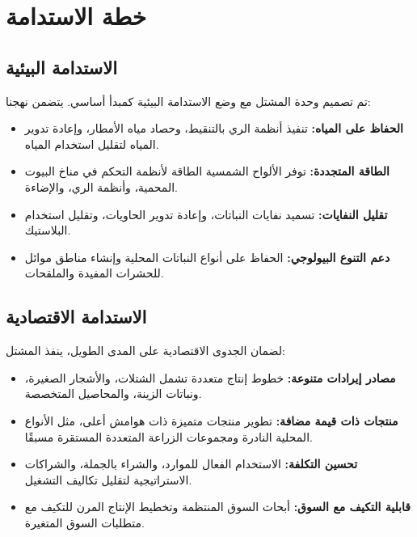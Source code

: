 \section{خطة الاستدامة}

\subsection{الاستدامة البيئية}

تم تصميم وحدة المشتل مع وضع الاستدامة البيئية كمبدأ أساسي. يتضمن نهجنا:

\begin{itemize}
    \item \textbf{الحفاظ على المياه:} تنفيذ أنظمة الري بالتنقيط، وحصاد مياه الأمطار، وإعادة تدوير المياه لتقليل استخدام المياه.
    
    \item \textbf{الطاقة المتجددة:} توفر الألواح الشمسية الطاقة لأنظمة التحكم في مناخ البيوت المحمية، وأنظمة الري، والإضاءة.
    
    \item \textbf{تقليل النفايات:} تسميد نفايات النباتات، وإعادة تدوير الحاويات، وتقليل استخدام البلاستيك.
    
    \item \textbf{دعم التنوع البيولوجي:} الحفاظ على أنواع النباتات المحلية وإنشاء مناطق موائل للحشرات المفيدة والملقحات.
\end{itemize}

\subsection{الاستدامة الاقتصادية}

لضمان الجدوى الاقتصادية على المدى الطويل، ينفذ المشتل:

\begin{itemize}
    \item \textbf{مصادر إيرادات متنوعة:} خطوط إنتاج متعددة تشمل الشتلات، والأشجار الصغيرة، ونباتات الزينة، والمحاصيل المتخصصة.
    
    \item \textbf{منتجات ذات قيمة مضافة:} تطوير منتجات متميزة ذات هوامش أعلى، مثل الأنواع المحلية النادرة ومجموعات الزراعة المتعددة المستقرة مسبقًا.
    
    \item \textbf{تحسين التكلفة:} الاستخدام الفعال للموارد، والشراء بالجملة، والشراكات الاستراتيجية لتقليل تكاليف التشغيل.
    
    \item \textbf{قابلية التكيف مع السوق:} أبحاث السوق المنتظمة وتخطيط الإنتاج المرن للتكيف مع متطلبات السوق المتغيرة.
\end{itemize}


